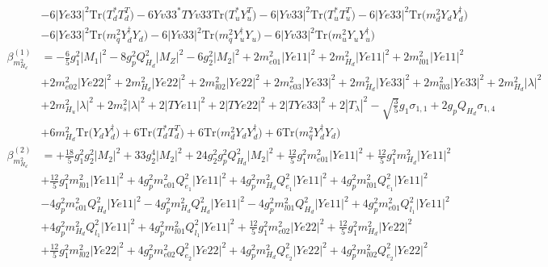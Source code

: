 \begin{align}
 &-6 |Ye33|^2 \mbox{Tr}\Big({T_d^*  T_{d}^{T}}\Big) -6 Yv33^* TYv33 \mbox{Tr}\Big({T_u^*  Y_{u}^{T}}\Big) -6 |Yv33|^2 \mbox{Tr}\Big({T_u^*  T_{u}^{T}}\Big) -6 |Ye33|^2 \mbox{Tr}\Big({m_d^2  Y_d  Y_{d}^{\dagger}}\Big) \nonumber \\ 
 &-6 |Ye33|^2 \mbox{Tr}\Big({m_q^2  Y_{d}^{\dagger}  Y_d}\Big) -6 |Yv33|^2 \mbox{Tr}\Big({m_q^2  Y_{u}^{\dagger}  Y_u}\Big) -6 |Yv33|^2 \mbox{Tr}\Big({m_u^2  Y_u  Y_{u}^{\dagger}}\Big) \\ 
\beta_{m_{H_d}^2}^{(1)} & =  
-\frac{6}{5} g_{1}^{2} |M_1|^2 -8 g_{p}^{2} Q_{H_d}^{2} |M_Z|^2 -6 g_{2}^{2} |M_2|^2 +2 m^2_{e01} |Ye11|^2 +2 m_{H_d}^2 |Ye11|^2 +2 m^2_{l01} |Ye11|^2 \nonumber \\ 
 &+2 m^2_{e02} |Ye22|^2 +2 m_{H_d}^2 |Ye22|^2 +2 m^2_{l02} |Ye22|^2 +2 m^2_{e03} |Ye33|^2 +2 m_{H_d}^2 |Ye33|^2 +2 m^2_{l03} |Ye33|^2 +2 m_{H_d}^2 |\lambda|^2 \nonumber \\ 
 &+2 m_{H_u}^2 |\lambda|^2 +2 m^2_{s} |\lambda|^2 +2 |TYe11|^2 +2 |TYe22|^2 +2 |TYe33|^2 +2 |T_{\lambda}|^2 - \sqrt{\frac{3}{5}} g_1 \sigma_{1,1} +2 g_p Q_{H_d} \sigma_{1,4} \nonumber \\ 
 &+6 m_{H_d}^2 \mbox{Tr}\Big({Y_d  Y_{d}^{\dagger}}\Big) +6 \mbox{Tr}\Big({T_d^*  T_{d}^{T}}\Big) +6 \mbox{Tr}\Big({m_d^2  Y_d  Y_{d}^{\dagger}}\Big) +6 \mbox{Tr}\Big({m_q^2  Y_{d}^{\dagger}  Y_d}\Big) \\ 
\beta_{m_{H_d}^2}^{(2)} & =  
+\frac{18}{5} g_{1}^{2} g_{2}^{2} |M_2|^2 +33 g_{2}^{4} |M_2|^2 +24 g_{2}^{2} g_{p}^{2} Q_{H_d}^{2} |M_2|^2 +\frac{12}{5} g_{1}^{2} m^2_{e01} |Ye11|^2 +\frac{12}{5} g_{1}^{2} m_{H_d}^2 |Ye11|^2 \nonumber \\ 
 &+\frac{12}{5} g_{1}^{2} m^2_{l01} |Ye11|^2 +4 g_{p}^{2} m^2_{e01} Q_{e_{1}}^{2} |Ye11|^2 +4 g_{p}^{2} m_{H_d}^2 Q_{e_{1}}^{2} |Ye11|^2 +4 g_{p}^{2} m^2_{l01} Q_{e_{1}}^{2} |Ye11|^2 \nonumber \\ 
 &-4 g_{p}^{2} m^2_{e01} Q_{H_d}^{2} |Ye11|^2 -4 g_{p}^{2} m_{H_d}^2 Q_{H_d}^{2} |Ye11|^2 -4 g_{p}^{2} m^2_{l01} Q_{H_d}^{2} |Ye11|^2 +4 g_{p}^{2} m^2_{e01} Q_{l_1}^{2} |Ye11|^2 \nonumber \\ 
 &+4 g_{p}^{2} m_{H_d}^2 Q_{l_1}^{2} |Ye11|^2 +4 g_{p}^{2} m^2_{l01} Q_{l_1}^{2} |Ye11|^2 +\frac{12}{5} g_{1}^{2} m^2_{e02} |Ye22|^2 +\frac{12}{5} g_{1}^{2} m_{H_d}^2 |Ye22|^2 \nonumber \\ 
 &+\frac{12}{5} g_{1}^{2} m^2_{l02} |Ye22|^2 +4 g_{p}^{2} m^2_{e02} Q_{e_{2}}^{2} |Ye22|^2 +4 g_{p}^{2} m_{H_d}^2 Q_{e_{2}}^{2} |Ye22|^2 +4 g_{p}^{2} m^2_{l02} Q_{e_{2}}^{2} |Ye22|^2 \nonumber \\ 

\end{align}
